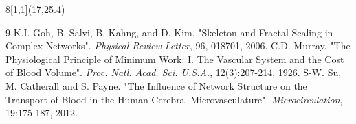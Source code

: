 \documentclass[a1,portrait]{a0poster}
\begin{document}

\begin{textblock}{8}[1,1](17,25.4)
    \small 
    

%
%
\begin{thebibliography}{9}
K.I. Goh, B. Salvi, B. Kahng, and D. Kim. "Skeleton and Fractal Scaling in Complex Networks". \emph{Physical Review Letter}, 96, 018701, 2006.
C.D. Murray. "The Physiological Principle of
Minimum Work: I. The Vascular System
and the Cost of Blood Volume". \emph{Proc. Natl.
Acad. Sci. U.S.A.}, 12(3):207-214, 1926.
S-W. Su, M. Catherall and S. Payne. "The Influence of Network Structure on the Transport of Blood in the Human Cerebral Microvasculature". \emph{Microcirculation}, 19:175-187, 2012.
\end{thebibliography}
\end{textblock}






\end{document}
